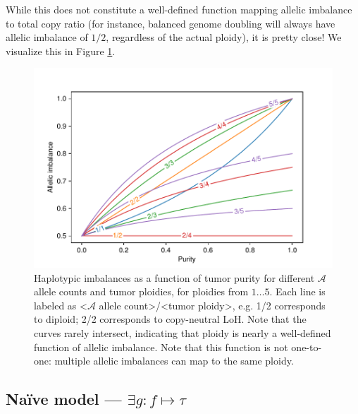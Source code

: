 \documentclass[10pt,letter]{article}
\numberwithin{equation}{section}
\begin{document}
While this does not constitute a well-defined function mapping allelic imbalance to total copy ratio (for instance, balanced genome doubling will always have allelic imbalance of $1/2$, regardless of the actual ploidy), it is pretty close! We visualize this in Figure \ref{ImbFig}.

\begin{figure}
\centering
\includegraphics[width=12cm]{Figs/imbalance.pdf}
\caption{Haplotypic imbalances as a function of tumor purity for different $\mathcal{A}$ allele counts and tumor ploidies, for ploidies from $1\dots 5$. Each line is labeled as <$\mathcal{A}$ allele count>/<tumor ploidy>, e.g. 1/2 corresponds to diploid; 2/2 corresponds to copy-neutral LoH. Note that the curves rarely intersect, indicating that ploidy is nearly a well-defined function of allelic imbalance. Note that this function is not one-to-one: multiple allelic imbalances can map to the same ploidy.}
\label{ImbFig}
\end{figure}

\subsection{Na\"ive model --- $\exists g : f\mapsto\tau$}
\end{document}
